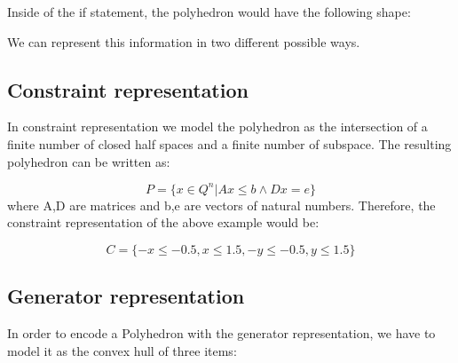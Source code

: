 Inside of the if statement, the polyhedron would have the following shape:


\begin{center}
\end{center}
We can represent this information in two different possible ways.
\subsection{Constraint representation}
In constraint representation we model the polyhedron as the intersection of a finite number of closed half spaces and a finite number of subspace. The resulting polyhedron can be written as:

\begin{equation}
	P=\{x\in Q^n |Ax\leq b \wedge Dx=e\}
\end{equation}
where A,D are matrices and b,e are vectors of natural numbers. Therefore, the constraint representation of the above example would be:

\begin{equation}
	C = \{-x \leq -0.5,x\leq 1.5 , -y \leq -0.5 ,y\leq 1.5\}
\end{equation}

\subsection{Generator representation}
In order to encode a Polyhedron with the generator representation, we have to model it as the convex hull of three items: 

